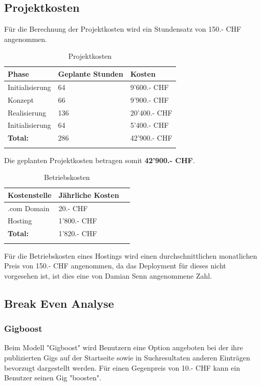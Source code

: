 \subsection{Projektkosten}

Für die Berechnung der Projektkosten wird ein Stundensatz von 150.- CHF angenommen.

\begin{longtable}[]{@{}lll@{}}
  \toprule
  \textbf{Phase}  & \textbf{Geplante Stunden} & \textbf{Kosten}\tabularnewline
  \midrule
  \endhead
  Initialisierung & 64                        & 9'600.- CHF\tabularnewline
  Konzept         & 66                        & 9'900.- CHF\tabularnewline
  Realisierung    & 136                       & 20'400.- CHF\tabularnewline
  Initialisierung & 64                        & 5'400.- CHF\tabularnewline
  \midrule
  \textbf{Total:} & 286                       & 42'900.- CHF\tabularnewline
  \bottomrule
  \caption{Projektkosten}
\end{longtable}

\noindent
Die geplanten Projektkosten betragen somit \textbf{42'900.- CHF}.

\begin{longtable}[]{@{}lll@{}}
  \toprule
  \textbf{Kostenstelle} & \textbf{Jährliche Kosten}\tabularnewline
  \midrule
  \endhead
  .com Domain           & 20.- CHF\tabularnewline
  Hosting               & 1'800.- CHF\tabularnewline
  \midrule
  \textbf{Total:}       & 1'820.- CHF\tabularnewline
  \bottomrule
  \caption{Betriebskosten}
\end{longtable}

Für die Betriebskosten eines Hostings wird einen durchschnittlichen monatlichen
Preis von 150.- CHF angenommen, da das Deployment für dieses nicht vorgesehen
ist, ist dies eine von Damian Senn angenommene Zahl.

\clearpage
\subsection{Break Even Analyse}\label{break-even-analyse}

\subsubsection{Gigboost}

Beim Modell "Gigboost" wird Benutzern eine Option angeboten bei der ihre
publizierten Gigs auf der Startseite sowie in Suchresultaten anderen Einträgen
bevorzugt dargestellt werden. Für einen Gegenpreis von 10.- CHF kann ein Benutzer
seinen Gig "boosten".


